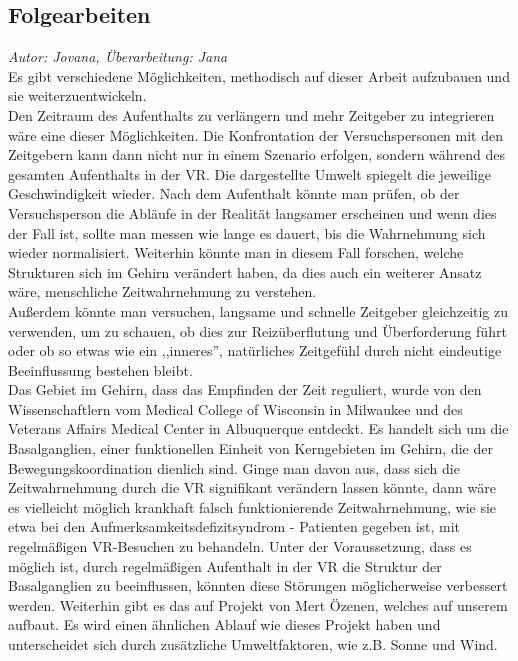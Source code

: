 \documentclass{Bericht}
\begin{document}
\subsection{Folgearbeiten}
\textit{Autor: Jovana, Überarbeitung: Jana}\\
Es gibt verschiedene Möglichkeiten, methodisch auf dieser Arbeit aufzubauen und sie weiterzuentwickeln.\\ Den Zeitraum des Aufenthalts zu verlängern und mehr Zeitgeber zu integrieren wäre eine dieser Möglichkeiten. Die Konfrontation der Versuchspersonen mit den Zeitgebern kann dann nicht nur in einem Szenario erfolgen, sondern während des gesamten Aufenthalts in der VR. Die dargestellte Umwelt spiegelt die jeweilige Geschwindigkeit wieder. Nach dem Aufenthalt könnte man prüfen, ob der Versuchsperson die Abläufe in der Realität langsamer erscheinen und wenn dies der Fall ist, sollte man messen wie lange es dauert, bis die Wahrnehmung sich wieder normalisiert. Weiterhin könnte man in diesem Fall forschen, welche Strukturen sich im Gehirn verändert haben, da dies auch ein weiterer Ansatz wäre, menschliche Zeitwahrnehmung zu verstehen.\\
Außerdem könnte man versuchen, langsame und schnelle Zeitgeber gleichzeitig zu verwenden, um zu schauen, ob dies zur Reizüberflutung und Überforderung führt oder ob so etwas wie ein ,,inneres'', natürliches Zeitgefühl durch nicht eindeutige Beeinflussung bestehen bleibt.\\
Das Gebiet im Gehirn, dass das Empfinden der Zeit reguliert, wurde von den Wissenschaftlern vom Medical College of Wisconsin in Milwaukee und des Veterans Affairs Medical Center in Albuquerque entdeckt. Es handelt sich um die Basalganglien, einer funktionellen Einheit von Kerngebieten im Gehirn, die der Bewegungskoordination dienlich sind. Ginge man davon aus, dass sich die Zeitwahrnehmung durch die VR signifikant verändern lassen könnte, dann wäre es vielleicht möglich krankhaft falsch funktionierende Zeitwahrnehmung, wie sie etwa bei den Aufmerksamkeitsdefizitsyndrom - Patienten gegeben ist, mit regelmäßigen VR-Besuchen zu behandeln. Unter der Voraussetzung, dass es möglich ist, durch regelmäßigen Aufenthalt in der VR die Struktur der Basalganglien zu beeinflussen, könnten diese Störungen möglicherweise verbessert werden.\cite{gehirn}
Weiterhin gibt es das auf Projekt von Mert Özenen, welches auf unserem aufbaut. Es wird einen ähnlichen Ablauf wie dieses Projekt haben und unterscheidet sich durch zusätzliche Umweltfaktoren, wie z.B. Sonne und Wind.
\end{document}
